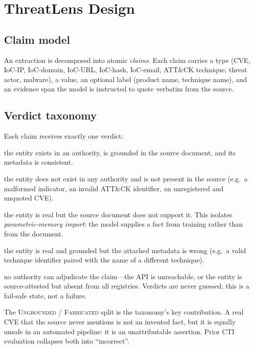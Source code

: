 \documentclass[10pt,twocolumn]{article}
\begin{document}
\section{ThreatLens Design}
\label{sec:design}

\subsection{Claim model}
An extraction is decomposed into atomic \emph{claims}. Each claim carries a
type (CVE, IoC-IP, IoC-domain, IoC-URL, IoC-hash, IoC-email, ATT\&CK technique,
threat actor, malware), a value, an optional label (product name, technique
name), and an evidence span the model is instructed to quote verbatim from the
source.

\subsection{Verdict taxonomy}
Each claim receives exactly one verdict:

\begin{description}\itemsep2pt
\item[\textsc{Verified}] the entity exists in an authority, is grounded in the
  source document, and its metadata is consistent.
\item[\textsc{Fabricated}] the entity does not exist in any authority and is
  not present in the source (e.g.\ a malformed indicator, an invalid ATT\&CK
  identifier, an unregistered and unquoted CVE).
\item[\textsc{Ungrounded}] the entity is real but the source document does not
  support it. This isolates \emph{parametric-memory import}: the model supplies
  a fact from training rather than from the document.
\item[\textsc{Mislabeled}] the entity is real and grounded but the attached
  metadata is wrong (e.g.\ a valid technique identifier paired with the name of
  a different technique).
\item[\textsc{Unverifiable}] no authority can adjudicate the claim---the API is
  unreachable, or the entity is source-attested but absent from all registries.
  Verdicts are never guessed; this is a fail-safe state, not a failure.
\end{description}

The \textsc{Ungrounded} / \textsc{Fabricated} split is the taxonomy's key
contribution. A real CVE that the source never mentions is not an invented
fact, but it is equally unsafe in an automated pipeline: it is an
unattributable assertion. Prior CTI evaluation collapses both into
``incorrect''.
\end{document}
